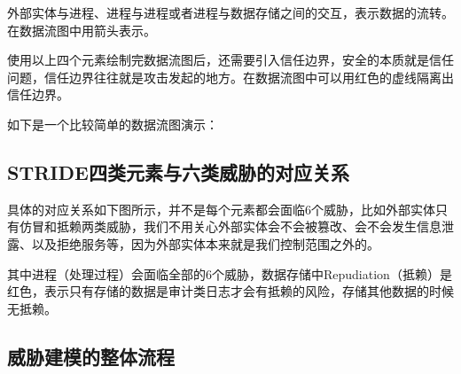 外部实体与进程、进程与进程或者进程与数据存储之间的交互，表示数据的流转。在数据流图中用箭头表示。

使用以上四个元素绘制完数据流图后，还需要引入信任边界，安全的本质就是信任问题，信任边界往往就是攻击发起的地方。在数据流图中可以用红色的虚线隔离出信任边界。

如下是一个比较简单的数据流图演示：

\subsection[]{STRIDE四类元素与六类威胁的对应关系}

具体的对应关系如下图所示，并不是每个元素都会面临6个威胁，比如外部实体只有仿冒和抵赖两类威胁，我们不用关心外部实体会不会被篡改、会不会发生信息泄露、以及拒绝服务等，因为外部实体本来就是我们控制范围之外的。

其中进程（处理过程）会面临全部的6个威胁，数据存储中Repudiation（抵赖）是红色，表示只有存储的数据是审计类日志才会有抵赖的风险，存储其他数据的时候无抵赖。

\subsection[]{威胁建模的整体流程}



